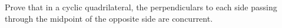 Prove that in a cyclic quadrilateral,
the perpendiculars to each side
passing through the midpoint of the opposite side
are concurrent.
